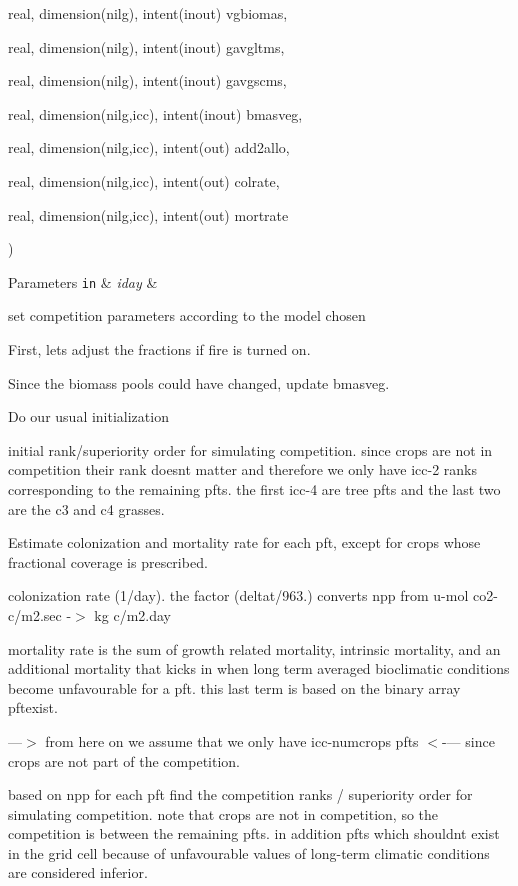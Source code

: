 {\begin{DoxyParamCaption}
\item[{real, dimension(nilg), intent(inout)}]{vgbiomas, }
\item[{real, dimension(nilg), intent(inout)}]{gavgltms, }
\item[{real, dimension(nilg), intent(inout)}]{gavgscms, }
\item[{real, dimension(nilg,icc), intent(inout)}]{bmasveg, }
\item[{real, dimension(nilg,icc), intent(out)}]{add2allo, }
\item[{real, dimension(nilg,icc), intent(out)}]{colrate, }
\item[{real, dimension(nilg,icc), intent(out)}]{mortrate}
\end{DoxyParamCaption}
)}\label{group__competition__scheme__competition_ga42c6fcccc542b3c3711cae7881d30665}

\begin{DoxyParams}[1]{Parameters}
\mbox{\tt in}  & {\em iday} & \\
\hline
\end{DoxyParams}
set competition parameters according to the model chosen

First, let\textquotesingle{}s adjust the fractions if fire is turned on.

Since the biomass pools could have changed, update bmasveg.

Do our usual initialization

initial rank/superiority order for simulating competition. since crops are not in competition their rank doesn\textquotesingle{}t matter and therefore we only have icc-\/2 ranks corresponding to the remaining pfts. the first icc-\/4 are tree pfts and the last two are the c3 and c4 grasses.

Estimate colonization and mortality rate for each pft, except for crops whose fractional coverage is prescribed.

colonization rate (1/day). the factor (deltat/963.) converts npp from u-\/mol co2-\/c/m2.\+sec -\/$>$ kg c/m2.\+day

mortality rate is the sum of growth related mortality, intrinsic mortality, and an additional mortality that kicks in when long term averaged bioclimatic conditions become unfavourable for a pft. this last term is based on the binary array pftexist.

---$>$ from here on we assume that we only have icc-\/numcrops pfts $<$-\/--- since crops are not part of the competition.

based on npp for each pft find the competition ranks / superiority order for simulating competition. note that crops are not in competition, so the competition is between the remaining pfts. in addition pfts which shouldn\textquotesingle{}t exist in the grid cell because of unfavourable values of long-\/term climatic conditions are considered inferior.

